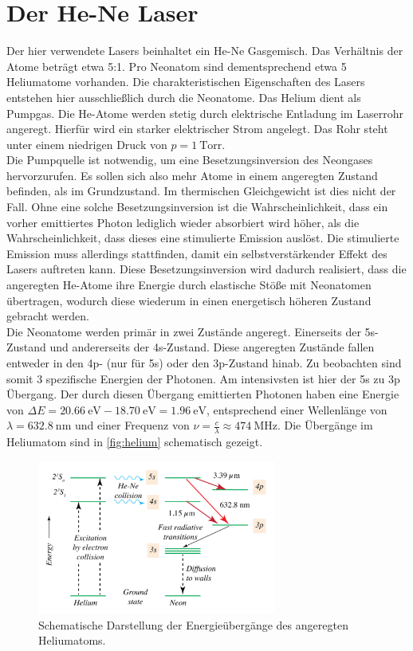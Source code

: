 \section{Der He-Ne Laser}

Der hier verwendete Lasers beinhaltet ein He-Ne Gasgemisch. Das Verhältnis der Atome beträgt etwa 5:1. Pro
Neonatom sind dementsprechend etwa 5 Heliumatome vorhanden. Die charakteristischen Eigenschaften des Lasers entstehen hier ausschließlich
durch die Neonatome. Das Helium dient als Pumpgas. Die He-Atome werden stetig durch elektrische Entladung im Laserrohr angeregt. Hierfür wird ein starker elektrischer Strom angelegt.
Das Rohr steht unter einem niedrigen Druck von $p = \qty{1}{\mathrm{Torr}}$\cite{v61}.\\
Die Pumpquelle ist notwendig, um eine Besetzungsinversion des Neongases hervorzurufen. Es sollen sich also mehr Atome in einem angeregten
Zustand befinden, als im Grundzustand. Im thermischen Gleichgewicht ist dies nicht der Fall. Ohne eine solche Besetzungsinversion ist die Wahrscheinlichkeit, dass ein vorher emittiertes
Photon lediglich wieder absorbiert wird höher, als die Wahrscheinlichkeit, dass dieses eine stimulierte Emission auslöst. Die stimulierte
Emission muss allerdings stattfinden, damit ein selbstverstärkender Effekt des Lasers auftreten kann.
Diese Besetzungsinversion wird dadurch realisiert, dass die angeregten He-Atome ihre Energie durch elastische Stöße mit Neonatomen übertragen,
wodurch diese wiederum in einen energetisch höheren Zustand gebracht werden. \\
Die Neonatome werden primär in zwei Zustände angeregt. Einerseits der 5s-Zustand und andererseits der 4s-Zustand. Diese angeregten
Zustände fallen entweder in den 4p- (nur für 5s) oder den 3p-Zustand hinab. Zu beobachten sind somit 3 spezifische Energien der Photonen.
Am intensivsten ist hier der 5s zu 3p Übergang. Der durch diesen Übergang emittierten Photonen haben eine Energie von 
$\Delta E = \qty{20.66}{\electronvolt} - \qty{18.70}{\electronvolt} = \qty{1.96}{\electronvolt}$\cite{Wikipedia_HeNe}, entsprechend einer 
Wellenlänge von $\lambda = \qty{632.8}{\nano\metre}$ und einer Frequenz von $\nu = \frac{c}{\lambda} \approx \qty{474}{\mega\hertz}$.
Die Übergänge im Heliumatom sind in \autoref{fig:helium} schematisch gezeigt.
\begin{figure}
    \centering
    \includegraphics[width = 0.7\textwidth]{v61_bilder/helium.png}
    \caption{Schematische Darstellung der Energieübergänge des angeregten Heliumatoms\cite{Wikipedia_HeNe}.}
    \label{fig:helium}
\end{figure}
